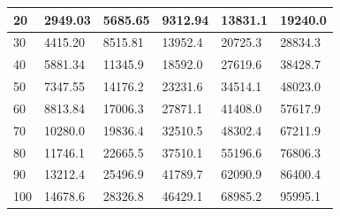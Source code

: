\begin{table}[H]
\begin{tabular}{|l|l|l|l|l|l|}
20                                                                         & 2949.03         & 5685.65          & 9312.94          & 13831.1          & 19240.0          \\ \hline
30                                                                         & 4415.20         & 8515.81          & 13952.4          & 20725.3          & 28834.3          \\ \hline
40                                                                         & 5881.34         & 11345.9          & 18592.0          & 27619.6          & 38428.7          \\ \hline
50                                                                         & 7347.55         & 14176.2          & 23231.6          & 34514.1          & 48023.0          \\ \hline
60                                                                         & 8813.84         & 17006.3          & 27871.1          & 41408.0          & 57617.9          \\ \hline
70                                                                         & 10280.0         & 19836.4          & 32510.5          & 48302.4          & 67211.9          \\ \hline
80                                                                         & 11746.1         & 22665.5          & 37510.1          & 55196.6          & 76806.3          \\ \hline
90                                                                         & 13212.4         & 25496.9          & 41789.7          & 62090.9          & 86400.4          \\ \hline
100                                                                        & 14678.6         & 28326.8          & 46429.1          & 68985.2          & 95995.1          \\ \hline
\end{tabular}
\end{table}


